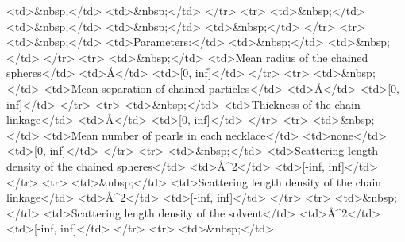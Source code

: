 \textless{}td\textgreater{}\&nbsp;\textless{}/td\textgreater{} \textless{}td\textgreater{}\&nbsp;\textless{}/td\textgreater{} \textless{}/tr\textgreater{} \textless{}tr\textgreater{} \textless{}td\textgreater{}\&nbsp;\textless{}/td\textgreater{} \textless{}td\textgreater{}\&nbsp;\textless{}/td\textgreater{} \textless{}td\textgreater{}\&nbsp;\textless{}/td\textgreater{} \textless{}td\textgreater{}\&nbsp;\textless{}/td\textgreater{} \textless{}/tr\textgreater{} \textless{}tr\textgreater{} \textless{}td\textgreater{}\&nbsp;\textless{}/td\textgreater{} \textless{}td\textgreater{}Parameters:\textless{}/td\textgreater{} \textless{}td\textgreater{}\&nbsp;\textless{}/td\textgreater{} \textless{}td\textgreater{}\&nbsp;\textless{}/td\textgreater{} \textless{}/tr\textgreater{} \textless{}tr\textgreater{} \textless{}td\textgreater{}\&nbsp;\textless{}/td\textgreater{} \textless{}td\textgreater{}Mean radius of the chained spheres\textless{}/td\textgreater{} \textless{}td\textgreater{}\AA{}\textless{}/td\textgreater{} \textless{}td\textgreater{}[0, inf]\textless{}/td\textgreater{} \textless{}/tr\textgreater{} \textless{}tr\textgreater{} \textless{}td\textgreater{}\&nbsp;\textless{}/td\textgreater{} \textless{}td\textgreater{}Mean separation of chained particles\textless{}/td\textgreater{} \textless{}td\textgreater{}\AA{}\textless{}/td\textgreater{} \textless{}td\textgreater{}[0, inf]\textless{}/td\textgreater{} \textless{}/tr\textgreater{} \textless{}tr\textgreater{} \textless{}td\textgreater{}\&nbsp;\textless{}/td\textgreater{} \textless{}td\textgreater{}Thickness of the chain linkage\textless{}/td\textgreater{} \textless{}td\textgreater{}\AA{}\textless{}/td\textgreater{} \textless{}td\textgreater{}[0, inf]\textless{}/td\textgreater{} \textless{}/tr\textgreater{} \textless{}tr\textgreater{} \textless{}td\textgreater{}\&nbsp;\textless{}/td\textgreater{} \textless{}td\textgreater{}Mean number of pearls in each necklace\textless{}/td\textgreater{} \textless{}td\textgreater{}none\textless{}/td\textgreater{} \textless{}td\textgreater{}[0, inf]\textless{}/td\textgreater{} \textless{}/tr\textgreater{} \textless{}tr\textgreater{} \textless{}td\textgreater{}\&nbsp;\textless{}/td\textgreater{} \textless{}td\textgreater{}Scattering length density of the chained spheres\textless{}/td\textgreater{} \textless{}td\textgreater{}\AA{}\textasciicircum{}2\textless{}/td\textgreater{} \textless{}td\textgreater{}[-inf, inf]\textless{}/td\textgreater{} \textless{}/tr\textgreater{} \textless{}tr\textgreater{} \textless{}td\textgreater{}\&nbsp;\textless{}/td\textgreater{} \textless{}td\textgreater{}Scattering length density of the chain linkage\textless{}/td\textgreater{} \textless{}td\textgreater{}\AA{}\textasciicircum{}2\textless{}/td\textgreater{} \textless{}td\textgreater{}[-inf, inf]\textless{}/td\textgreater{} \textless{}/tr\textgreater{} \textless{}tr\textgreater{} \textless{}td\textgreater{}\&nbsp;\textless{}/td\textgreater{} \textless{}td\textgreater{}Scattering length density of the solvent\textless{}/td\textgreater{} \textless{}td\textgreater{}\AA{}\textasciicircum{}2\textless{}/td\textgreater{} \textless{}td\textgreater{}[-inf, inf]\textless{}/td\textgreater{} \textless{}/tr\textgreater{} \textless{}tr\textgreater{} \textless{}td\textgreater{}\&nbsp;\textless{}/td\textgreater{} 